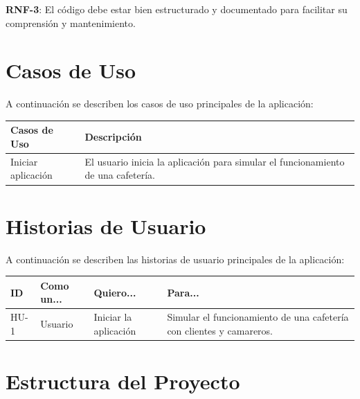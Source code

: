 \documentclass[12pt]{article}
\begin{document}
\justify
\textbf{RNF-3}: El código debe estar bien estructurado y documentado para facilitar su comprensión y mantenimiento.

\newpage

\section{Casos de Uso}

\justify
A continuación se describen los casos de uso principales de la aplicación:

\begin{table}[h]
    \centering

    \begin{tabularx}{\textwidth}{|X|X|}\hline

        \textbf{Casos de Uso}&  \textbf{Descripción}\\\hline
        Iniciar aplicación&El usuario inicia la aplicación para simular el funcionamiento de una cafetería.\\ \hline

    \end{tabularx}
  
\end{table}

\section{Historias de Usuario}

\justify
A continuación se describen las historias de usuario principales de la aplicación:

\begin{table}[h]

    \centering

    \begin{tabularx}{\textwidth}{|X|X|X|X|}\hline

        \textbf{ID}&  \textbf{Como un...}& \textbf{Quiero...}& \textbf{Para...}\\\hline

        HU-1&Usuario&Iniciar la aplicación&Simular el funcionamiento de una cafetería con clientes y camareros.\\ \hline

    \end{tabularx}

\end{table}

\newpage

\section{Estructura del Proyecto}
\end{document}
